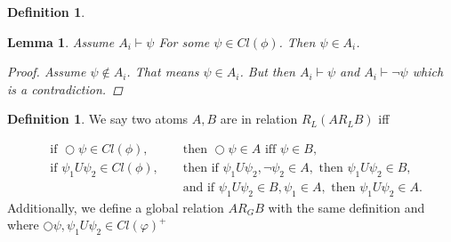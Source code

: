 \documentclass[11pt]{article}
\newtheorem{lemma}[theorem]{Lemma}
\theoremstyle{definition}
\newtheorem{definition}[theorem]{Definition}
\theoremstyle{remark}
\begin{document}
\begin{definition}

\end{definition}

\begin{lemma}
    Assume $A_i \vdash \psi$ For some $\psi \in Cl(\phi)$. Then $\psi \in A_i$.

    \begin{proof}
        Assume $\psi \notin A_i$. That means $\psi \in A_i$. But then $A_i \vdash \psi$ and $A_i \vdash \neg \psi$ which is a contradiction.
    \end{proof}
\end{lemma}

\begin{definition}
    We say two atoms $A,B$ are in relation $R_L (A R_L B)$ iff

\[
\begin{aligned}
&\text{if } \bigcirc \psi \in Cl(\phi),
&&\text{ then } \bigcirc \psi \in A \text{ iff } \psi \in B, \\[2mm]
&\text{if } \psi_1 U \psi_2 \in Cl(\phi),
&&\text{ then if } \psi_1 U \psi_2, \neg\psi_2 \in A,
   \text{ then } \psi_1 U \psi_2 \in B, \\
&&&\text{ and if } \psi_1 U \psi_2 \in B, \psi_1 \in A,
   \text{ then } \psi_1 U \psi_2 \in A.
\end{aligned}
\]
Additionally, we define a global relation $A R_G B$ with the same definition and where $\bigcirc \psi, \psi_1 U \psi_2 \in Cl(\varphi)^+$
\end{definition}
\end{document}
